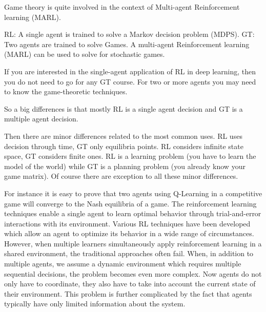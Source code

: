 \documentclass[conference]{IEEEtran}
\begin{document}
\begin{enumerate}
Game theory is quite involved in the context of Multi-agent Reinforcement learning (MARL).

RL: A single agent is trained to solve a Markov decision problem (MDPS). GT: Two agents are trained to solve Games. A multi-agent Reinforcement learning (MARL) can be used to solve for stochastic games.

If you are interested in the single-agent application of RL in deep learning, then you do not need to go for any GT course. For two or more agents you may need to know the game-theoretic techniques.

So a big differences is that mostly RL is a single agent decision and GT is a multiple agent decision.

Then there are minor differences related to the most common uses. RL uses decision through time, GT only equilibria points. RL considers infinite state space, GT considers finite ones. RL is a learning problem (you have to learn the model of the world) while GT is a planning problem (you already know your game matrix). Of course there are exception to all these minor differences.

For instance it is easy to prove that two agents using Q-Learning in a competitive game will converge to the Nash equilibria of a game.
The reinforcement learning techniques enable a single
agent to learn optimal behavior through trial-and-error interactions with its environment. Various RL techniques have been developed which allow an agent to optimize its behavior in a wide range of circumstances. However, when multiple learners simultaneously apply reinforcement learning in a shared environment, the traditional
approaches often fail.
When, in addition to multiple agents, we assume a dynamic environment which
requires multiple sequential decisions, the problem becomes even more complex.
Now agents do not only have to coordinate, they also have to take into account the
current state of their environment. This problem is further complicated by the fact
that agents typically have only limited information about the system.


\end{enumerate}
\end{document}
